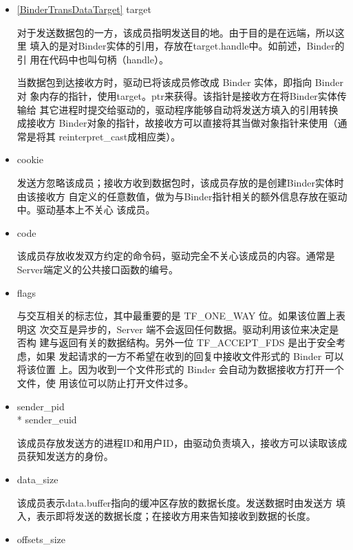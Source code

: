 \documentclass[a4paper,11pt]{article}
\begin{document}
\begin{itemize}
    \item \ref{BinderTransDataTarget} target

        对于发送数据包的一方，该成员指明发送目的地。由于目的是在远端，所以这里
        填入的是对Binder实体的引用，存放在target.handle中。如前述，Binder的引
        用在代码中也叫句柄（handle）。

        当数据包到达接收方时，驱动已将该成员修改成 Binder 实体，即指向 Binder 对
        象内存的指针，使用target。ptr来获得。该指针是接收方在将Binder实体传输给
        其它进程时提交给驱动的，驱动程序能够自动将发送方填入的引用转换成接收方
        Binder对象的指针，故接收方可以直接将其当做对象指针来使用（通常是将其
        reinterpret_cast成相应类）。

    \item cookie

        发送方忽略该成员；接收方收到数据包时，该成员存放的是创建Binder实体时由该接收方
        自定义的任意数值，做为与Binder指针相关的额外信息存放在驱动中。驱动基本上不关心
        该成员。

    \item code

        该成员存放收发双方约定的命令码，驱动完全不关心该成员的内容。通常是
        Server端定义的公共接口函数的编号。

    \item flags 

          与交互相关的标志位，其中最重要的是 TF_ONE_WAY 位。如果该位置上表明这
          次交互是异步的，Server 端不会返回任何数据。驱动利用该位来决定是否构
          建与返回有关的数据结构。另外一位 TF_ACCEPT_FDS 是出于安全考虑，如果
          发起请求的一方不希望在收到的回复中接收文件形式的 Binder 可以将该位置
          上。因为收到一个文件形式的 Binder 会自动为数据接收方打开一个文件，使
          用该位可以防止打开文件过多。

      \item sender_pid\\* sender_euid

          该成员存放发送方的进程ID和用户ID，由驱动负责填入，接收方可以读取该成员获知发送方的身份。

      \item data_size

          该成员表示data.buffer指向的缓冲区存放的数据长度。发送数据时由发送方
          填入，表示即将发送的数据长度；在接收方用来告知接收到数据的长度。

      \item offsets_size


\end{itemize}
\end{document}
